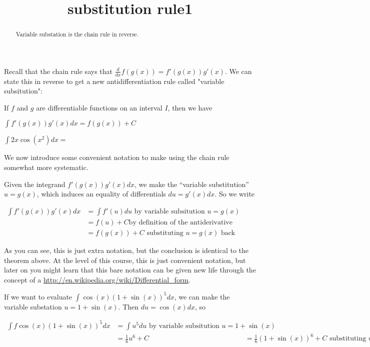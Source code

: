 \documentclass{ximera}
\title{substitution rule1}
\begin{document}
\begin{abstract}
  Variable substation is the chain rule in reverse.
\end{abstract}

\maketitle


Recall that the chain rule says that $\frac{d}{dx} f(g(x)) = f'(g(x))g'(x)$.  We can state this in reverse to get a new antidifferentiation rule called "variable subsitution":

\begin{theorem}
If $f$ and $g$ are differentiable functions on an interval $I$, then we have

$\displaystyle\int f'(g(x))g'(x)dx = f(g(x))+C$
\end{theorem}

\begin{question}
	$\int 2x\cos(x^2) dx=$
\end{question}

We now introduce some convenient notation to make using the chain rule somewhat more systematic.

Given the integrand $f'(g(x))g'(x)dx$, we make the ``variable substitution'' $ u = g(x)$, which induces an equality of differentials $du = g'(x)dx$.  So we write

$\begin{align*}
	\displaystyle \int f'(g(x))g'(x) dx &= \displaystyle \int f'(u) du \text{ by variable subsitution \(u=g(x)\)}\\
	&=f(u)+C \text{by definition of the antiderivative}\\
	&=f(g(x)) +C \text{ substituting \(u=g(x)\) back}
\end{align*}$

As you can see, this is just extra notation, but the conclusion is identical to the theorem above.  At the level of this course, this is just convenient notation, but later on you might learn that this bare notation can be given new life through the concept of a \href{differential form}{http://en.wikipedia.org/wiki/Differential_form}.

\begin{example}
If we want to evaluate $\displaystyle \int \cos(x)(1+\sin(x))^5 dx$, we can make the variable substation $u = 1+\sin(x)$.  Then $du=\cos(x)dx$, so

$\begin{align*}
	\displaystyle \int f\cos(x)(1+\sin(x))^5 dx &= \displaystyle \int u^5 du \text{ by variable subsitution \(u=1+\sin(x)\)}\\
	&=\frac{1}{6}u^6+C
	&=\frac{1}{6}(1+\sin(x))^6 +C \text{ substituting \(u=1+\sin(x)\) back}
\end{align*}$

\end{example}
\end{document}
